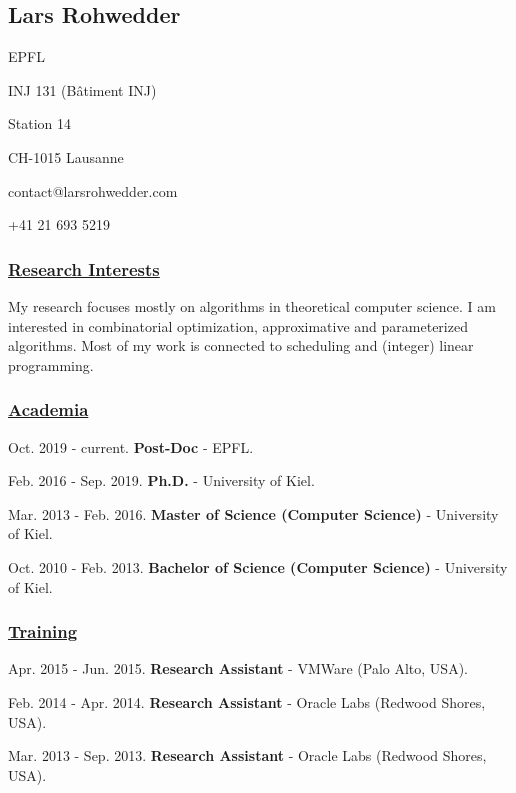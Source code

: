\documentclass{article}
\begin{document}
  \subsection*{Lars Rohwedder}
  
    \noindent EPFL
  
    \noindent INJ 131 (Bâtiment INJ)
  
    \noindent Station 14
  
    \noindent CH-1015 Lausanne
  
  \noindent contact@larsrohwedder.com

  \noindent +41 21 693 5219

  \subsubsection*{\underline{Research Interests}}
    My research focuses mostly on algorithms in theoretical computer science. I am interested in combinatorial optimization, approximative and parameterized algorithms. Most of my work is connected to scheduling and (integer) linear programming.


  \subsubsection*{\underline{Academia}}
  
    \noindent
    Oct. 2019 - current.\textbf{ Post-Doc }- EPFL. \medskip

  
    \noindent
    Feb. 2016 - Sep. 2019.\textbf{ Ph.D. }- University of Kiel. \medskip

  
    \noindent
    Mar. 2013 - Feb. 2016.\textbf{ Master of Science (Computer Science) }- University of Kiel. \medskip

  
    \noindent
    Oct. 2010 - Feb. 2013.\textbf{ Bachelor of Science (Computer Science) }- University of Kiel. \medskip

  

  \subsubsection*{\underline{Training}}
  
    \noindent
    Apr. 2015 - Jun. 2015.\textbf{ Research Assistant }- VMWare (Palo Alto, USA). \medskip

  
    \noindent
    Feb. 2014 - Apr. 2014.\textbf{ Research Assistant }- Oracle Labs (Redwood Shores, USA). \medskip

  
    \noindent
    Mar. 2013 - Sep. 2013.\textbf{ Research Assistant }- Oracle Labs (Redwood Shores, USA). \medskip
\end{document}
